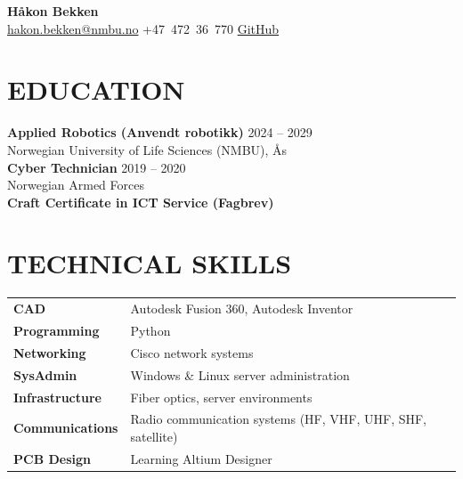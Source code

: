 \documentclass[a4paper,10pt]{article}
\begin{document}
\begin{center}
  {\LARGE\bfseries\color{dark} Håkon Bekken}\\[0.4em]
  {\small\color{mid} \href{mailto:hakon.bekken@nmbu.no}{hakon.bekken@nmbu.no} \;\textbar\; +47~472~36~770 \;\textbar\; \href{https://github.com/realhaakon}{GitHub}}
\end{center}

\vspace{0.3em}

\section{EDUCATION}

\noindent\textbf{Applied Robotics (Anvendt robotikk)} \hfill {\small\color{mid} 2024 -- 2029}\\
{\small Norwegian University of Life Sciences (NMBU), Ås}\\[0.5ex]

\noindent\textbf{Cyber Technician} \hfill {\small\color{mid} 2019 -- 2020}\\
{\small Norwegian Armed Forces}\\[0.5ex]

\noindent\textbf{Craft Certificate in ICT Service (Fagbrev)} \hfill {\small\color{mid} }\\[0.3ex]


\section{TECHNICAL SKILLS}

\noindent
\begin{tabularx}{\textwidth}{@{}>{\bfseries\small}l X}
  CAD           & Autodesk Fusion 360, Autodesk Inventor \\
  Programming   & Python \\
  Networking    & Cisco network systems \\
  SysAdmin      & Windows \& Linux server administration \\
  Infrastructure & Fiber optics, server environments \\
  Communications & Radio communication systems (HF, VHF, UHF, SHF, satellite) \\
  PCB Design     & Learning Altium Designer \\
\end{tabularx}
\end{document}
